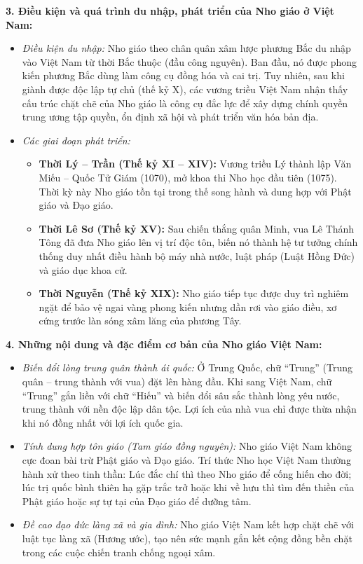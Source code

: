 \documentclass[12pt,a4paper]{article}
\begin{document}
\noindent
\textbf{3. Điều kiện và quá trình du nhập, phát triển của Nho giáo ở Việt Nam:}
\begin{itemize}
    \item \textit{Điều kiện du nhập:} Nho giáo theo chân quân xâm lược phương Bắc du nhập vào Việt Nam từ thời Bắc thuộc (đầu công nguyên). Ban đầu, nó được phong kiến phương Bắc dùng làm công cụ đồng hóa và cai trị. Tuy nhiên, sau khi giành được độc lập tự chủ (thế kỷ X), các vương triều Việt Nam nhận thấy cấu trúc chặt chẽ của Nho giáo là công cụ đắc lực để xây dựng chính quyền trung ương tập quyền, ổn định xã hội và phát triển văn hóa bản địa.
    \item \textit{Các giai đoạn phát triển:}
    \begin{itemize}
        \item \textbf{Thời Lý -- Trần (Thế kỷ XI -- XIV):} Vương triều Lý thành lập Văn Miếu -- Quốc Tử Giám (1070), mở khoa thi Nho học đầu tiên (1075). Thời kỳ này Nho giáo tồn tại trong thế song hành và dung hợp với Phật giáo và Đạo giáo.
        \item \textbf{Thời Lê Sơ (Thế kỷ XV):} Sau chiến thắng quân Minh, vua Lê Thánh Tông đã đưa Nho giáo lên vị trí độc tôn, biến nó thành hệ tư tưởng chính thống duy nhất điều hành bộ máy nhà nước, luật pháp (Luật Hồng Đức) và giáo dục khoa cử.
        \item \textbf{Thời Nguyễn (Thế kỷ XIX):} Nho giáo tiếp tục được duy trì nghiêm ngặt để bảo vệ ngai vàng phong kiến nhưng dần rơi vào giáo điều, xơ cứng trước làn sóng xâm lăng của phương Tây.
    \end{itemize}
\end{itemize}

\noindent
\textbf{4. Những nội dung và đặc điểm cơ bản của Nho giáo Việt Nam:}
\begin{itemize}
    \item \textit{Biến đổi lòng trung quân thành ái quốc:} Ở Trung Quốc, chữ ``Trung'' (Trung quân -- trung thành với vua) đặt lên hàng đầu. Khi sang Việt Nam, chữ ``Trung'' gắn liền với chữ ``Hiếu'' và biến đổi sâu sắc thành lòng yêu nước, trung thành với nền độc lập dân tộc. Lợi ích của nhà vua chỉ được thừa nhận khi nó đồng nhất với lợi ích quốc gia.
    \item \textit{Tính dung hợp tôn giáo (Tam giáo đồng nguyên):} Nho giáo Việt Nam không cực đoan bài trừ Phật giáo và Đạo giáo. Trí thức Nho học Việt Nam thường hành xử theo tinh thần: Lúc đắc chí thì theo Nho giáo để cống hiến cho đời; lúc trị quốc bình thiên hạ gặp trắc trở hoặc khi về hưu thì tìm đến thiền của Phật giáo hoặc sự tự tại của Đạo giáo để dưỡng tâm.
    \item \textit{Đề cao đạo đức làng xã và gia đình:} Nho giáo Việt Nam kết hợp chặt chẽ với luật tục làng xã (Hương ước), tạo nên sức mạnh gắn kết cộng đồng bền chặt trong các cuộc chiến tranh chống ngoại xâm.
\end{itemize}
\end{document}

